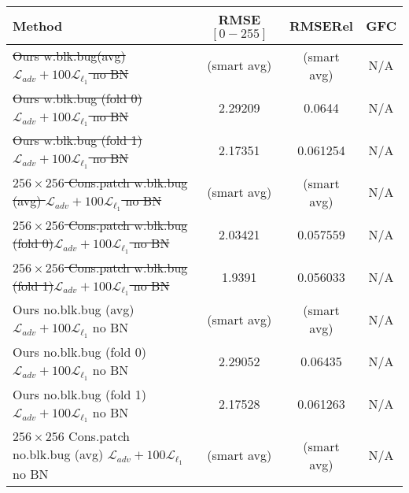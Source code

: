 \documentclass{bmvc2k}
\begin{document}
\begin{table}%
	\begin{center}
		\begin{tabular}{|l|ccc|}
			\hline
			Method & RMSE $[0-255]$ & RMSERel & GFC \\
			\hline\hline
			\sout{Ours w.blk.bug(avg) $\mathcal{L}_{adv} + 100\mathcal{L}_{\ell_1}$ no BN} & (smart avg) & (smart avg) & N/A\\
   			\sout{Ours w.blk.bug (fold 0)$\mathcal{L}_{adv} + 100\mathcal{L}_{\ell_1}$ no BN} & 2.29209 & 0.0644 & N/A\\          
			\sout{Ours w.blk.bug (fold 1)$\mathcal{L}_{adv} + 100\mathcal{L}_{\ell_1}$ no BN} & 2.17351 & 0.061254 & N/A\\
			\hline
            \sout{$256\times256$ Cons.patch w.blk.bug (avg) $\mathcal{L}_{adv} + 100\mathcal{L}_{\ell_1}$ no BN} & (smart avg) & (smart avg) & N/A\\
			\sout{$256\times256$ Cons.patch w.blk.bug (fold 0)$\mathcal{L}_{adv} + 100\mathcal{L}_{\ell_1}$ no BN} & 2.03421 & 0.057559 & N/A\\
			\sout{$256\times256$ Cons.patch w.blk.bug (fold 1)$\mathcal{L}_{adv} + 100\mathcal{L}_{\ell_1}$ no BN} & 1.9391 & 0.056033 & N/A\\ 					\hline       
            \hline            
            Ours no.blk.bug (avg) $\mathcal{L}_{adv} + 100\mathcal{L}_{\ell_1}$ no BN & (smart avg) & (smart avg) & N/A\\
			Ours no.blk.bug (fold 0)$\mathcal{L}_{adv} + 100\mathcal{L}_{\ell_1}$ no BN & 2.29052 & 0.06435 & N/A\\
   			Ours no.blk.bug (fold 1)$\mathcal{L}_{adv} + 100\mathcal{L}_{\ell_1}$ no BN & 2.17528 & 0.061263 & N/A\\
            \hline
            $256\times256$ Cons.patch no.blk.bug (avg) $\mathcal{L}_{adv} + 100\mathcal{L}_{\ell_1}$ no BN & (smart avg) & (smart avg) & N/A\\

\end{tabular}
\end{center}
\end{table}
\end{document}
